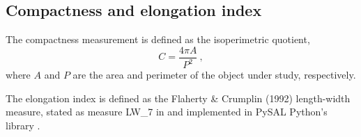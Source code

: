 \subsection{Compactness and elongation index}

The compactness measurement is defined as the isoperimetric quotient,
\begin{equation}
    C=\frac{4\pi A}{P^2} \ ,
\end{equation}
where $A$ and $P$ are the area and perimeter of the object under study,
respectively.

The elongation index is defined as the Flaherty \& Crumplin (1992)
length-width measure, stated as measure LW\_7 in \cite{Altman1998} and
implemented in PySAL Python's library \cite{pysal2007}.